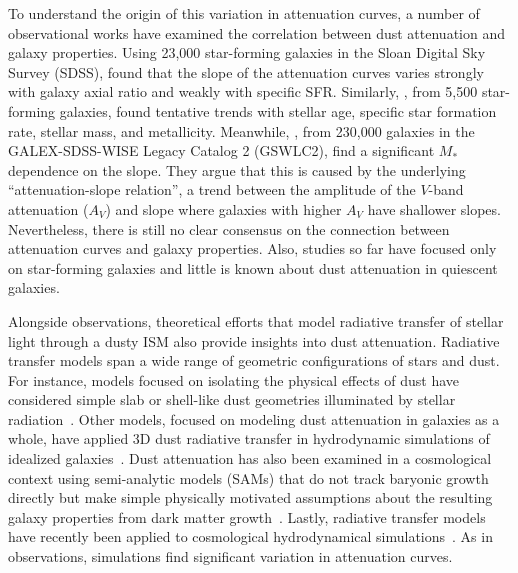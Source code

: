 To understand the origin of this variation in attenuation curves, a number of
observational  works have examined the correlation between dust attenuation and
galaxy properties. Using 23,000 star-forming galaxies in the Sloan Digital
Sky Survey (SDSS), \cite{wild2011} found that the slope of the attenuation
curves varies strongly with galaxy axial ratio and weakly with specific SFR.
Similarly, \cite{battisti2017}, from 5,500 star-forming galaxies, found tentative
trends with stellar age, specific star formation rate, stellar mass, and
metallicity. Meanwhile, \cite{salim2018}, from 230,000 galaxies in the
GALEX-SDSS-WISE Legacy Catalog 2 (GSWLC2), find a significant $M_*$ 
dependence on the slope. They argue that this is caused by the underlying 
``attenuation-slope relation'', a trend between the amplitude of the 
$V$-band attenuation ($A_V$) and slope where galaxies with higher $A_V$ have
shallower slopes. Nevertheless, there is still no clear consensus on the
connection between attenuation curves and galaxy properties. Also, studies 
so far have focused only on star-forming galaxies and little is known
about dust attenuation in quiescent galaxies.

Alongside observations, theoretical efforts that model radiative transfer of
stellar light through a dusty ISM also provide insights into dust attenuation.
Radiative transfer models span a wide range of geometric configurations of
stars and dust. For instance, models focused on isolating the physical effects
of dust have considered simple slab or shell-like dust geometries illuminated
by stellar radiation~\citep[\eg][]{witt1996, witt2000, seon2016}. Other models,
focused on modeling dust attenuation in galaxies as a whole, have applied 3D
dust radiative transfer in hydrodynamic simulations of idealized
galaxies~\citep[\eg][]{jonsson2006, rocha2008, hayward2015, natale2015,
hou2017}. Dust attenuation has also been examined in a cosmological context
using semi-analytic models (SAMs) that do not track baryonic growth directly 
but make simple physically motivated assumptions about the resulting galaxy
properties from dark matter growth~\citep[\eg][]{granato2000,
fontanot2009, wilkins2012, gonzalez-perez2013}. Lastly, radiative transfer
models have recently been applied to cosmological hydrodynamical
simulations~\cite[\eg][]{camps2015, narayanan2018, trayford2020}. As in
observations, simulations find significant variation in attenuation
curves. %

